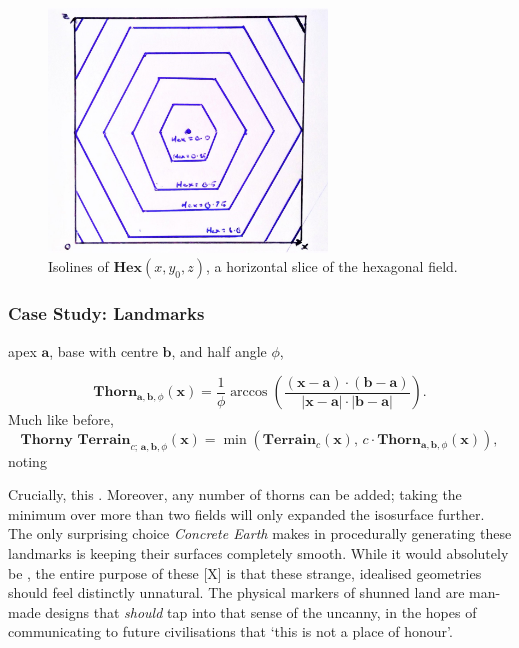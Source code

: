 \documentclass[a4paper, 11pt]{article}
\begin{document}
\begin{flushleft}
\vspace{5pt}\noindent
\begin{figure}[t]
\centering
\includegraphics[width=0.66\textwidth]{Hex Field}
\caption{Isolines of $\textbf{Hex}(x,y_0,z)$, a horizontal slice of the hexagonal field.}
\label{Hex Field}
\end{figure}

\subsubsection{Case Study: Landmarks}

apex $\mathbf{a}$, base with centre $\mathbf{b}$, and half angle $\phi$,

$$\textbf{Thorn}_{\mathbf{a},\mathbf{b},\phi}(\mathbf{x}) = \frac{1}{\phi}\arccos\left(\frac{\left(\mathbf{x}-\mathbf{a}\right)\cdot\left(\mathbf{b}-\mathbf{a}\right)}{\left|\mathbf{x}-\mathbf{a}\right|\cdot\left|\mathbf{b}-\mathbf{a}\right|}\right).$$
Much like before,
$$\textbf{Thorny Terrain}_{c;\,\mathbf{a},\mathbf{b},\phi}(\mathbf{x}) = \min\left(\textbf{Terrain}_c(\mathbf{x}), \, c\cdot\textbf{Thorn}_{\mathbf{a},\mathbf{b},\phi}(\mathbf{x})\right),$$
noting %


\vspace{5pt}\noindent
Crucially, this  . Moreover, any number of thorns can be added; taking the minimum over more than two fields will only expanded the isosurface further. The only surprising choice \textit{Concrete Earth} makes in procedurally generating these landmarks is keeping their surfaces completely smooth. While it would absolutely be , the entire purpose of these [X] is that these strange, idealised geometries should feel distinctly unnatural. The physical markers of shunned land are man-made designs that \textit{should} tap into that sense of the uncanny, in the hopes of communicating to future civilisations that `this is not a place of honour'.  %


\end{flushleft}
\end{document}

